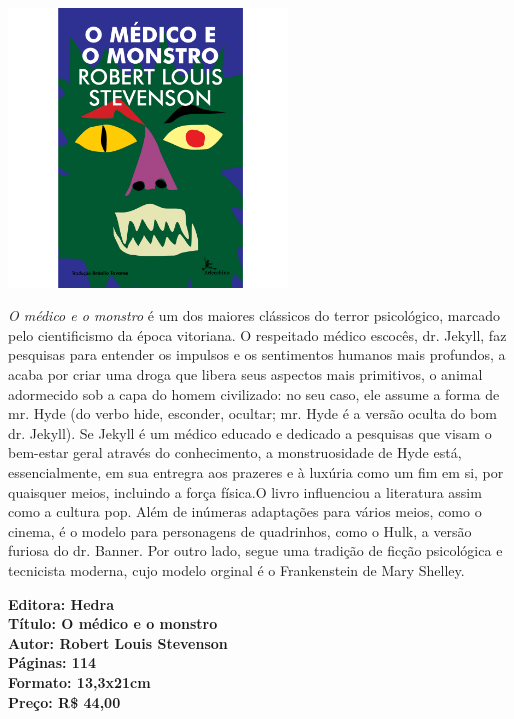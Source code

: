 \pagebreak

\begin{center}
\hspace*{-3.6cm}
\hspace*{3.1cm}\includegraphics[width=74mm]{./grid/medico.png}
\end{center}

\hspace*{-7cm}\hrulefill\hspace*{-7cm}

\medskip

\noindent{}\textit{O médico e o monstro} é um dos maiores clássicos do terror psicológico, marcado pelo cientificismo da época vitoriana. O respeitado médico escocês, dr. Jekyll, faz pesquisas para entender os impulsos e os sentimentos humanos mais profundos, a acaba por criar uma droga que libera seus aspectos mais primitivos, o animal adormecido sob a capa do homem civilizado: no seu caso, ele assume a forma de mr. Hyde (do verbo hide, esconder, ocultar; mr. Hyde é a versão oculta do bom dr. Jekyll). Se Jekyll é um médico educado e dedicado a pesquisas que visam o bem-estar geral através do conhecimento, a monstruosidade de Hyde está, essencialmente, em sua entregra aos prazeres e à luxúria como um fim em si, por quaisquer meios, incluindo a força física.O livro influenciou a literatura assim como a cultura pop. Além de inúmeras adaptações para vários meios, como o cinema, é o modelo para personagens de quadrinhos, como o Hulk, a versão furiosa do dr. Banner. Por outro lado, segue uma tradição de ficção psicológica e tecnicista moderna, cujo modelo orginal é o Frankenstein de Mary Shelley.

\vfill

\noindent\begin{minipage}[c]{1\linewidth}
{\small\textbf{
\hspace*{-.1cm}Editora: Hedra\\
Título: O médico e o monstro\\
Autor: Robert Louis Stevenson\\ 
Páginas: 114\\
Formato: 13,3x21cm\\
Preço: R\$ 44,00\\
}}
\end{minipage}


